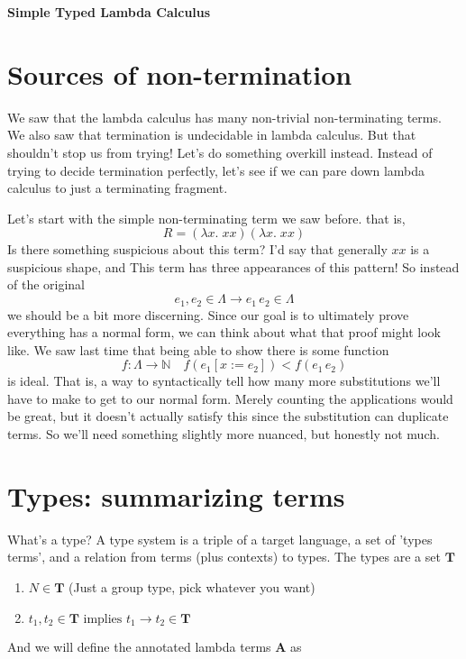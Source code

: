 \documentclass[12pt]{article}
\begin{document}
\baselineskip 12pt

\begin{center}
\textbf{\Large Simple Typed Lambda Calculus} \\
\end{center}

\section{Sources of non-termination}
We saw that the lambda calculus has many non-trivial non-terminating terms. 
We also saw that termination is undecidable in lambda calculus.
But that shouldn't stop us from trying!
Let's do something overkill instead.
Instead of trying to decide termination perfectly, let's see if we can pare down lambda calculus to just a terminating fragment.

Let's start with the simple non-terminating term we saw before.
that is,
\[
  R = (\lambda x.\; xx)(\lambda x.\; xx)
\]
Is there something suspicious about this term?
I'd say that generally $xx$ is a suspicious shape, and
This term has three appearances of this pattern! 
So instead of the original 
\[
  e_1, e_2 \in \Lambda \rightarrow e_1 \, e_2 \in \Lambda
\]
we should be a bit more discerning.
Since our goal is to ultimately prove everything has a normal form, we can think about what that proof might look like.
We saw last time that being able to show there is some function 
\[
  f : \Lambda \rightarrow \mathbb{N}\quad f(e_1[x:=e_2]) < f(e_1 \, e_2)
\]
is ideal.
That is, a way to syntactically tell how many more substitutions we'll have to make to get to our normal form.
Merely counting the applications would be great, but it doesn't actually satisfy this since the substitution can duplicate terms.
So we'll need something slightly more nuanced, but honestly not much.

\section{Types: summarizing terms}
What's a type? 
A type system is a triple of a target language, a set of 'types terms', and a relation from terms (plus contexts) to types.
The types are a set $\mathbf{T}$
\begin{enumerate}
    \item $N \in \mathbf{T}$ (Just a group type, pick whatever you want)
    \item $t_1, t_2 \in \mathbf{T} \text{ implies } t_1 \rightarrow t_2 \in \mathbf{T}$
\end{enumerate}
And we will define the annotated lambda terms $\mathbf{A}$ as
\end{document}
